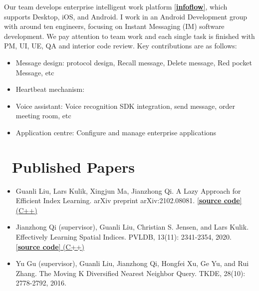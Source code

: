 \documentclass{resume}
\begin{document}
Our team develops enterprise intelligent work platform \href{https://infoflow.baidu.com/}{[\textbf{infoflow}]}, which supports Desktop, iOS, and Android. I work in an Android Development group with around ten engineers, focusing on Instant Messaging (IM) software development.  We pay attention to team work and each single task is finished with PM, UI, UE, QA and interior code review. Key contributions are as follows:
\begin{itemize}
  \item Message design: protocol design, Recall message, Delete message, Red pocket Message, etc
  \item Heartbeat mechanism:
  \item Voice assistant: Voice recognition SDK integration, send message, order meeting room, etc
  \item Application centre: Configure and manage enterprise applications
\end{itemize}




%
  

\section{\faFilesO\ Published Papers}
\begin{itemize}
 \item Guanli Liu, Lars Kulik, Xingjun Ma, Jianzhong Qi. A Lazy Approach for Efficient Index Learning. arXiv preprint arXiv:2102.08081. \href{https://github.com/Liuguanli/ModelReuse}{[\textbf{source code}] (C++)} 
 
  \item Jianzhong Qi (supervisor), Guanli Liu, Christian S. Jensen, and Lars Kulik. Effectively Learning Spatial Indices. PVLDB, 13(11): 2341-2354, 2020.  \href{https://github.com/Liuguanli/RSMI}{[\textbf{source code}] (C++)}

  \item Yu Gu (supervisor), Guanli Liu, Jianzhong Qi, Hongfei Xu, Ge Yu, and Rui Zhang. The Moving K Diversified Nearest Neighbor Query. TKDE, 28(10): 2778-2792, 2016.
\end{itemize}
\end{document}
